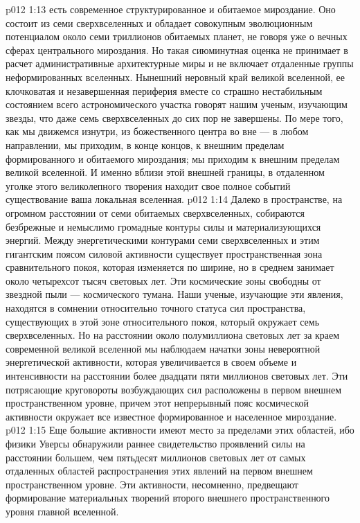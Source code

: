 \vs p012 1:13  есть современное структурированное и обитаемое мироздание. Оно состоит из семи сверхвселенных и обладает совокупным эволюционным потенциалом около семи триллионов обитаемых планет, не говоря уже о вечных сферах центрального мироздания. Но такая сиюминутная оценка не принимает в расчет административные архитектурные миры и не включает отдаленные группы неформированных вселенных. Нынешний неровный край великой вселенной, ее клочковатая и незавершенная периферия вместе со страшно нестабильным состоянием всего астрономического участка говорят нашим ученым, изучающим звезды, что даже семь сверхвселенных до сих пор не завершены. По мере того, как мы движемся изнутри, из божественного центра во вне --- в любом направлении, мы приходим, в конце концов, к внешним пределам формированного и обитаемого мироздания; мы приходим к внешним пределам великой вселенной. И именно вблизи этой внешней границы, в отдаленном уголке этого великолепного творения находит свое полное событий существование ваша локальная вселенная.
\vs p012 1:14  Далеко в пространстве, на огромном расстоянии от семи обитаемых сверхвселенных, собираются безбрежные и немыслимо громадные контуры силы и материализующихся энергий. Между энергетическими контурами семи сверхвселенных и этим гигантским поясом силовой активности существует пространственная зона сравнительного покоя, которая изменяется по ширине, но в среднем занимает около четырехсот тысяч световых лет. Эти космические зоны свободны от звездной пыли --- космического тумана. Наши ученые, изучающие эти явления, находятся в сомнении относительно точного статуса сил пространства, существующих в этой зоне относительного покоя, который окружает семь сверхвселенных. Но на расстоянии около полумиллиона световых лет за краем современной великой вселенной мы наблюдаем начатки зоны невероятной энергетической активности, которая увеличивается в своем объеме и интенсивности на расстоянии более двадцати пяти миллионов световых лет. Эти потрясающие круговороты возбуждающих сил расположены в первом внешнем пространственном уровне, причем этот непрерывный пояс космической активности окружает все известное формированное и населенное мироздание.
\vs p012 1:15 Еще большие активности имеют место за пределами этих областей, ибо физики Уверсы обнаружили раннее свидетельство проявлений силы на расстоянии большем, чем пятьдесят миллионов световых лет от самых отдаленных областей распространения этих явлений на первом внешнем пространственном уровне. Эти активности, несомненно, предвещают формирование материальных творений второго внешнего пространственного уровня главной вселенной.
